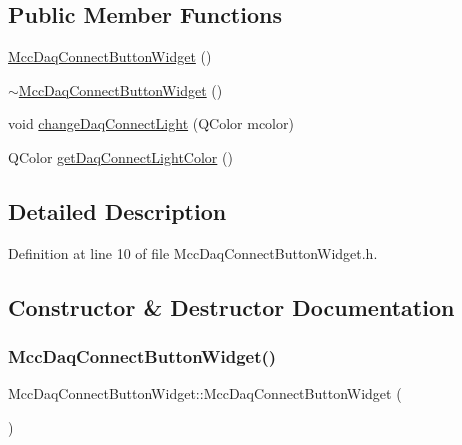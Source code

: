 \subsection*{Public Member Functions}
\begin{DoxyCompactItemize}
\item 
\hyperlink{class_mcc_daq_connect_button_widget_a388d7025c1333e53c20c77dada8a6f0b}{Mcc\+Daq\+Connect\+Button\+Widget} ()
\item 
\hyperlink{class_mcc_daq_connect_button_widget_a80bc18ee2d499d244991117c8156332a}{$\sim$\+Mcc\+Daq\+Connect\+Button\+Widget} ()
\item 
void \hyperlink{class_mcc_daq_connect_button_widget_a13cf53dd69d563035e8ce30fec54a003}{change\+Daq\+Connect\+Light} (Q\+Color mcolor)
\item 
Q\+Color \hyperlink{class_mcc_daq_connect_button_widget_a4d63807d04d7c3d09e6316394bc55833}{get\+Daq\+Connect\+Light\+Color} ()
\end{DoxyCompactItemize}


\subsection{Detailed Description}


Definition at line 10 of file Mcc\+Daq\+Connect\+Button\+Widget.\+h.



\subsection{Constructor \& Destructor Documentation}
\mbox{\label{class_mcc_daq_connect_button_widget_a388d7025c1333e53c20c77dada8a6f0b}} 
\subsubsection{\texorpdfstring{Mcc\+Daq\+Connect\+Button\+Widget()}{MccDaqConnectButtonWidget()}}
{\footnotesize\ttfamily Mcc\+Daq\+Connect\+Button\+Widget\+::\+Mcc\+Daq\+Connect\+Button\+Widget (\begin{DoxyParamCaption}{ }\end{DoxyParamCaption})}



